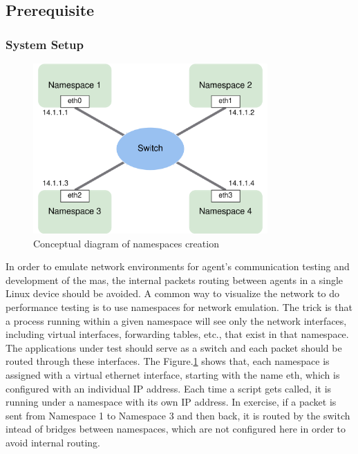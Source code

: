 \subsection{Prerequisite}
\subsubsection{System Setup}
 
\begin{figure}[htbp]
\includegraphics[width=0.8\textwidth]{figures/NamespaceConceptual.png}
\centering
\caption{Conceptual diagram of namespaces creation
\label{fig: NSConceptual}}
\end{figure}

In order to emulate network environments for agent's communication testing and development of the \gls{mas}, the internal packets routing between agents in a single Linux device should be avoided. A common way to visualize the network to do performance testing is to use namespaces for network emulation. The trick is that a process running within a given namespace will see only the network interfaces, including virtual interfaces, forwarding tables, etc., that exist in that namespace. The applications under test should serve as a switch and each packet should be routed through these interfaces. The Figure.\ref{fig: NSConceptual} shows that, each namespace is assigned with a virtual ethernet interface, starting with the name eth, which is configured with an individual IP address. Each time a script gets called, it is running under a namespace with its own IP address. In exercise, if a packet is sent from Namespace 1 to Namespace 3 and then back, it is routed by the switch intead of bridges between namespaces, which are not configured here in order to avoid internal routing.

